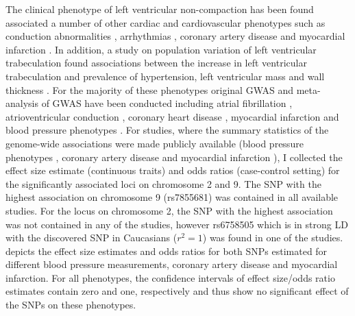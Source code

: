 The clinical phenotype of left ventricular non-compaction has been found associated a number of other cardiac and cardiovascular phenotypes such as conduction abnormalities \citep{Yousef2009}, arrhythmias \citep{Ritter1997,Oechslin2000,Yousef2009}, coronary artery disease \citep{Ritter1997,Junga1999,Jenni2002,Soler2002} and myocardial infarction \citep{Swinkels2007,Toufan2012,Guvens2012}. In addition, a study on population variation of left ventricular trabeculation found associations between the increase in left ventricular trabeculation and prevalence of hypertension, left ventricular mass and wall thickness \citep{Captur2015}. For the majority of these phenotypes original GWAS and meta-analysis of GWAS have been conducted including atrial fibrillation \citep{Gudbjartsson2007,Christophersen2017}, atrioventricular conduction \citep{Denny2010}, coronary heart disease \citep{Schunkert2011,Lee2013a,Nikpay2015}, myocardial infarction \citep{Kathiresan2009,Hirokawa2015,Nikpay2015,Dehghan2016} and blood pressure phenotypes \citep{Ehret2011,Wain2011}. For studies, where the summary statistics of the genome-wide associations were made publicly available (blood pressure phenotypes \citep{Ehret2011,Wain2011}, coronary artery disease \citep{Schunkert2011} and myocardial infarction \citep{Nikpay2015}), I collected the effect size estimate (continuous traits) and odds ratios (case-control setting) for the significantly associated loci on chromosome 2 and 9. The SNP with the highest association on chromosome 9 (rs7855681) was contained in all available studies. For the locus on chromosome 2, the SNP with the highest association was not contained in any of the studies, however rs6758505 which is in strong LD with the discovered SNP in Caucasians (\(r^2=1\)) was found in one of the studies.  depicts the effect size estimates and odds ratios for both SNPs estimated for different blood pressure measurements, coronary artery disease and myocardial infarction. For all phenotypes, the confidence intervals of effect size/odds ratio estimates contain zero and one, respectively and thus show no significant effect of the SNPs on these phenotypes. 
%
